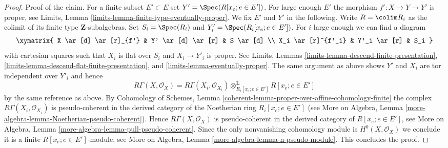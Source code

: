 \begin{proof}
\medskip\noindent
Proof of the claim.
For a finite subset $E' \subset E$ set $Y' = \Spec(R[x_e; e \in E'])$.
For large enough $E'$ the morphism $f' : X \to Y \to Y'$ is proper, see
Limits, Lemma \ref{limits-lemma-finite-type-eventually-proper}.
We fix $E'$ and $Y'$ in the following.
Write $R = \colim R_i$ as the colimit of its finite type
$\mathbf{Z}$-subalgebras. Set $S_i = \Spec(R_i)$
and $Y'_i = \Spec(R_i[x_e; e \in E'])$.
For $i$ large enough we can find a diagram
$$
\xymatrix{
X \ar[d] \ar[r]_{f'} & Y' \ar[d] \ar[r] & S \ar[d] \\
X_i \ar[r]^{f'_i} & Y'_i \ar[r] & S_i
}
$$
with cartesian squares such that $X_i$ is flat over $S_i$ and
$X_i \to Y'_i$ is proper. See
Limits, Lemmas \ref{limits-lemma-descend-finite-presentation},
\ref{limits-lemma-descend-flat-finite-presentation}, and
\ref{limits-lemma-eventually-proper}.
The same argument as above shows $Y'$ and $X_i$
are tor independent over $Y'_i$ and hence
$$
R\Gamma(X, \mathcal{O}_X) =
R\Gamma(X_i, \mathcal{O}_{X_i})
\otimes^\mathbf{L}_{R_i[x_e; e \in E']}
R[x_e; e \in E']
$$
by the same reference as above. By Cohomology of Schemes, Lemma
\ref{coherent-lemma-proper-over-affine-cohomology-finite}
the complex $R\Gamma(X_i, \mathcal{O}_{X_i})$ is pseudo-coherent
in the derived category of the Noetherian ring $R_i[x_e; e \in E']$ (see
More on Algebra, Lemma \ref{more-algebra-lemma-Noetherian-pseudo-coherent}).
Hence $R\Gamma(X, \mathcal{O}_X)$ is pseudo-coherent in the derived
category of $R[x_e; e \in E']$, see
More on Algebra, Lemma \ref{more-algebra-lemma-pull-pseudo-coherent}.
Since the only nonvanishing cohomology module
is $H^0(X, \mathcal{O}_X)$ we conclude it is a finite
$R[x_e; e \in E']$-module, see
More on Algebra, Lemma \ref{more-algebra-lemma-n-pseudo-module}.
This concludes the proof.
\end{proof}